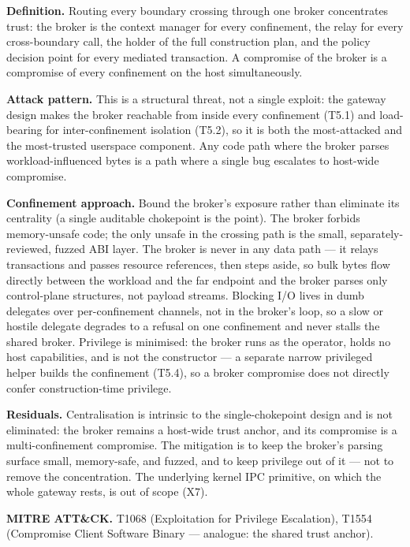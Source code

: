 \textbf{Definition.} Routing every boundary crossing through one broker
concentrates trust: the broker is the context manager for every
confinement, the relay for every cross-boundary call, the holder of the
full construction plan, and the policy decision point for every mediated
transaction. A compromise of the broker is a compromise of every
confinement on the host simultaneously.

\textbf{Attack pattern.} This is a structural threat, not a single
exploit: the gateway design makes the broker reachable from inside every
confinement (T5.1) and load-bearing for inter-confinement isolation
(T5.2), so it is both the most-attacked and the most-trusted userspace
component. Any code path where the broker parses workload-influenced
bytes is a path where a single bug escalates to host-wide compromise.

\textbf{Confinement approach.} Bound the broker's exposure rather than
eliminate its centrality (a single auditable chokepoint is the point).
The broker forbids memory-unsafe code; the only unsafe in the crossing
path is the small, separately-reviewed, fuzzed ABI layer. The broker is
never in any data path --- it relays transactions and passes resource
references, then steps aside, so bulk bytes flow directly between the
workload and the far endpoint and the broker parses only control-plane
structures, not payload streams. Blocking I/O lives in dumb delegates
over per-confinement channels, not in the broker's loop, so a slow or
hostile delegate degrades to a refusal on one confinement and never
stalls the shared broker. Privilege is minimised: the broker runs as the
operator, holds no host capabilities, and is not the constructor --- a
separate narrow privileged helper builds the confinement (T5.4), so a
broker compromise does not directly confer construction-time privilege.

\textbf{Residuals.} Centralisation is intrinsic to the single-chokepoint
design and is not eliminated: the broker remains a host-wide trust
anchor, and its compromise is a multi-confinement compromise. The
mitigation is to keep the broker's parsing surface small, memory-safe,
and fuzzed, and to keep privilege out of it --- not to remove the
concentration. The underlying kernel IPC primitive, on which the whole
gateway rests, is out of scope (X7).

\textbf{MITRE ATT\&CK.} T1068 (Exploitation for Privilege Escalation),
T1554 (Compromise Client Software Binary --- analogue: the shared trust
anchor).

